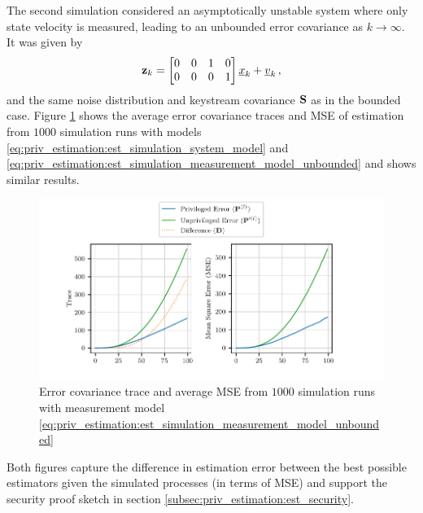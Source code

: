 The second simulation considered an asymptotically unstable system where only state velocity is measured, leading to an unbounded error covariance as $k \rightarrow \infty$. It was given by 
\begin{equation}\label{eq:priv_estimation:est_simulation_measurement_model_unbounded}
    {\ensuremath{{\mathbf{z}}}}_k=
    \begin{bmatrix}
        0 & 0 & 1 & 0\\
        0 & 0 & 0 & 1
    \end{bmatrix}
    {\underline{x}}_k + {\underline{v}}_k\,,
\end{equation}
and the same noise distribution and keystream covariance ${{\mathbf{S}}}$ as in the bounded case. Figure \ref{fig:priv_estimation:est_sim_unbounded} shows the average error covariance traces and MSE of estimation from $1000$ simulation runs with models \eqref{eq:priv_estimation:est_simulation_system_model} and \eqref{eq:priv_estimation:est_simulation_measurement_model_unbounded} and shows similar results.
\begin{figure}[htbp]
    \centering
    \includegraphics{figures/priv_estimation_est_sim_unbounded.pdf}
    \caption{Error covariance trace and average MSE from $1000$ simulation runs with measurement model \eqref{eq:priv_estimation:est_simulation_measurement_model_unbounded}}
    \label{fig:priv_estimation:est_sim_unbounded}
\end{figure}

Both figures capture the difference in estimation error between the best possible estimators given the simulated processes (in terms of MSE) and support the security proof sketch in section \ref{subsec:priv_estimation:est_security}.

